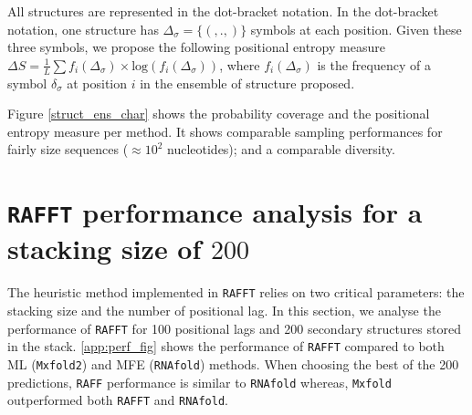 All structures are represented in the dot-bracket notation. In the dot-bracket
notation, one structure has $\Delta_{\sigma}=\{(, ., )\}$ symbols at each position. Given
these three symbols, we propose the following positional entropy measure
$\Delta S=\frac{1}{L}\sum f_i(\Delta_{\sigma}) \times \text{log}(f_i(\Delta_{\sigma}))$, where $f_i(\Delta_{\sigma})$ is the frequency of a symbol $\delta_{\sigma}$ at position $i$ in the ensemble of structure proposed.

Figure \ref{struct_ens_char} shows the probability coverage and the positional
entropy measure per method. It shows comparable sampling performances for fairly
size sequences ($\approx 10^2$ nucleotides); and a comparable diversity.

\section{\texttt{RAFFT} performance analysis for a stacking size of $200$}
The heuristic method implemented in \texttt{RAFFT} relies on two critical parameters: the stacking size and the number of positional lag. In this section, we analyse the performance of \texttt{RAFFT} for 100 positional lags and 200 secondary structures stored in the stack. \autoref{app:perf_fig} shows the performance of \texttt{RAFFT} compared to both \ac{ML} (\texttt{Mxfold2}) and \ac{MFE} (\texttt{RNAfold}) methods. When choosing the best of the 200 predictions, \texttt{RAFF} performance is similar to \texttt{RNAfold} whereas, \texttt{Mxfold} outperformed both \texttt{RAFFT} and \texttt{RNAfold}. 
\hspace{-2cm}
